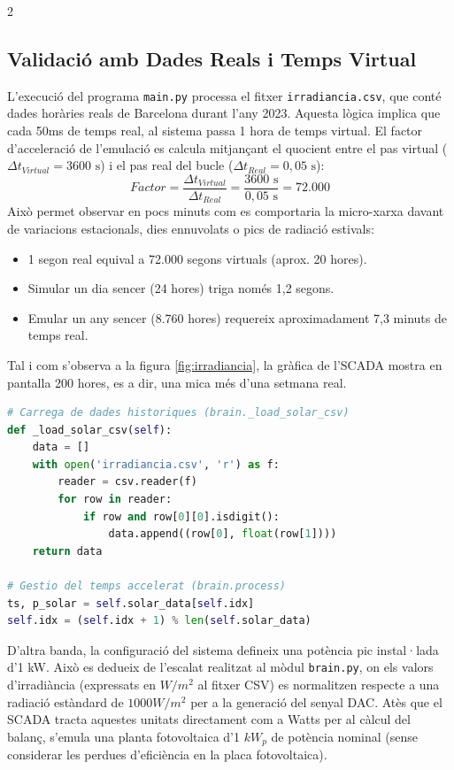 \documentclass[11pt,a4paper]{article}
\begin{document}
\begin{multicols}{2}
    \subsection{Validació amb Dades Reals i Temps Virtual}
    L'execució del programa \texttt{main.py} processa el fitxer \texttt{irradiancia.csv}, que conté dades horàries reals de Barcelona durant l'any 2023. Aquesta lògica implica que cada 50ms de temps real, al sistema passa 1 hora de temps virtual. El factor d'acceleració de l'emulació es calcula mitjançant el quocient entre el pas virtual ($\Delta t_{Virtual} = 3600\text{ s}$) i el pas real del bucle ($\Delta t_{Real} = 0,05\text{ s}$):
    \begin{equation}
        Factor = \frac{\Delta t_{Virtual}}{\Delta t_{Real}} = \frac{3600\text{ s}}{0,05\text{ s}} = 72.000
    \end{equation}
    Això permet observar en pocs minuts com es comportaria la micro-xarxa davant de variacions estacionals, dies ennuvolats o pics de radiació estivals:
    \begin{itemize}[leftmargin=*, nosep]
        \item 1 segon real equival a 72.000 segons virtuals (aprox. 20 hores).
        \item Simular un dia sencer (24 hores) triga només 1,2 segons.
        \item Emular un any sencer (8.760 hores) requereix aproximadament 7,3 minuts de temps real.
    \end{itemize}

    Tal i com s'observa a la figura \ref{fig:irradiancia}, la gràfica de l'SCADA mostra en pantalla 200 hores, es a dir, una mica més d'una setmana real.

    \begin{lstlisting}[language=Python]
# Carrega de dades historiques (brain._load_solar_csv)
def _load_solar_csv(self):
    data = []
    with open('irradiancia.csv', 'r') as f:
        reader = csv.reader(f)
        for row in reader:
            if row and row[0][0].isdigit():
                data.append((row[0], float(row[1])))
    return data

# Gestio del temps accelerat (brain.process)
ts, p_solar = self.solar_data[self.idx]
self.idx = (self.idx + 1) % len(self.solar_data)
\end{lstlisting}

    D'altra banda, la configuració del sistema defineix una potència pic instal·lada d'1 kW. Això es dedueix de l'escalat realitzat al mòdul \texttt{brain.py}, on els valors d'irradiància (expressats en $W/m^2$ al fitxer CSV) es normalitzen respecte a una radiació estàndard de $1000 W/m^2$ per a la generació del senyal DAC. Atès que el SCADA tracta aquestes unitats directament com a Watts per al càlcul del balanç, s'emula una planta fotovoltaica d'1 $kW_p$ de potència nominal (sense considerar les perdues d'eficiència en la placa fotovoltaica).


\end{multicols}
\end{document}
